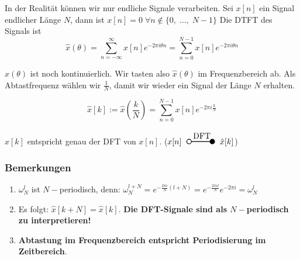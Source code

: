 \documentclass[11pt]{article}
\newcommand{\transform}[2]{%
    \begin{tikzpicture}
        \draw[thick] (0,0) circle (0.1);
        \draw[thick] (0.1,0) -- (#2,0) node[midway, above] {#1};
        \filldraw[thick] (#2,0) circle (0.1);
    \end{tikzpicture}%
}
\begin{document}
In der Realität können wir nur endliche Signale verarbeiten. Sei $x[n]$ ein Signal endlicher Länge $N$, dann ist $x[n]=0 \; \forall n \notin \{ 0, \; \dots, \; N-1 \}$
Die DTFT des Signals ist
$$\hat{x}(\theta) = \sum_{n=-\infty}^\infty x[n]e^{-2 \pi i \theta n} = \sum_{n=0}^{N-1} x[n]e^{-2 \pi i \theta n}$$

$\hat{x}(\theta)$ ist noch kontinuierlich. Wir tasten also $\hat{x}(\theta)$ im Frequenzbereich ab. Als Abtastfrequenz wählen wir $\frac{1}{N}$, damit wir wieder ein Signal der Länge $N$ erhalten.

$$\hat{x}[k] := \hat{x}\left(\frac{k}{N}\right) = \sum_{n=0}^{N-1} x[n]e^{-2 \pi i \frac{k}{N}} $$

$\hat{x}[k]$ entspricht genau der DFT von $x[n]$. \hspace*{0.5cm} ($x[n] \hspace{6pt} \transform{DFT}{1} \hspace{6pt} \hat{x}[k]$)

%
\subsubsection*{Bemerkungen}
\vspace*{-0.5cm}
\begin{enumerate}
    \item $\omega_N^l$ ist $N-$periodisch, denn: $\omega_N^{l + N} = e^{-\frac{2 \pi i}{N}(l+N)} = e^{-\frac{2 \pi i l}{N}} e^{- 2 \pi i} = \omega_N^l$
    \item Es folgt: $\hat{x}[k+N] = \hat{x}[k]$. \textbf{Die DFT-Signale sind als $N-$periodisch zu interpretieren!}
    \item \textbf{Abtastung im Frequenzbereich entspricht Periodisierung im Zeitbereich}.
\end{enumerate}
\end{document}
